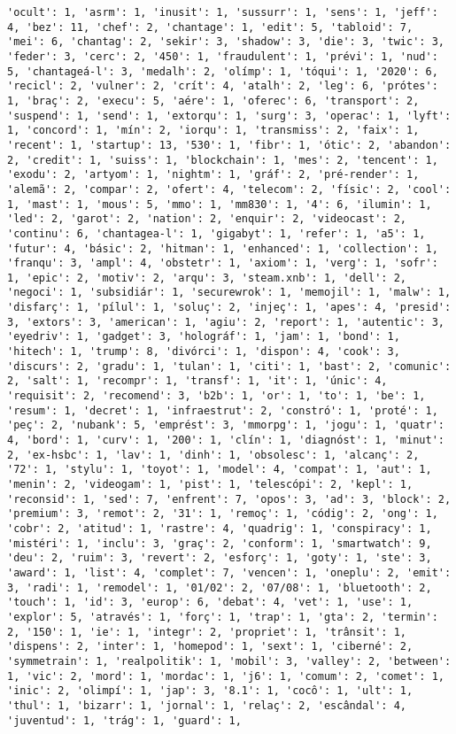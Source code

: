 \documentclass[11pt]{article}
\begin{document}
\begin{Verbatim}[commandchars=\\\{\}]
'ocult': 1, 'asrm': 1, 'inusit': 1, 'sussurr': 1, 'sens': 1, 'jeff': 4, 'bez': 11, 'chef': 2, 'chantage': 1, 'edit': 5, 'tabloid': 7, 'mei': 6, 'chantag': 2, 'sekir': 3, 'shadow': 3, 'die': 3, 'twic': 3, 'feder': 3, 'cerc': 2, '450': 1, 'fraudulent': 1, 'prévi': 1, 'nud': 5, 'chantageá-l': 3, 'medalh': 2, 'olímp': 1, 'tóqui': 1, '2020': 6, 'recicl': 2, 'vulner': 2, 'crít': 4, 'atalh': 2, 'leg': 6, 'prótes': 1, 'braç': 2, 'execu': 5, 'aére': 1, 'oferec': 6, 'transport': 2, 'suspend': 1, 'send': 1, 'extorqu': 1, 'surg': 3, 'operac': 1, 'lyft': 1, 'concord': 1, 'mín': 2, 'iorqu': 1, 'transmiss': 2, 'faix': 1, 'recent': 1, 'startup': 13, '530': 1, 'fibr': 1, 'ótic': 2, 'abandon': 2, 'credit': 1, 'suiss': 1, 'blockchain': 1, 'mes': 2, 'tencent': 1, 'exodu': 2, 'artyom': 1, 'nightm': 1, 'gráf': 2, 'pré-render': 1, 'alemã': 2, 'compar': 2, 'ofert': 4, 'telecom': 2, 'físic': 2, 'cool': 1, 'mast': 1, 'mous': 5, 'mmo': 1, 'mm830': 1, '4': 6, 'ilumin': 1, 'led': 2, 'garot': 2, 'nation': 2, 'enquir': 2, 'videocast': 2, 'continu': 6, 'chantagea-l': 1, 'gigabyt': 1, 'refer': 1, 'a5': 1, 'futur': 4, 'básic': 2, 'hitman': 1, 'enhanced': 1, 'collection': 1, 'franqu': 3, 'ampl': 4, 'obstetr': 1, 'axiom': 1, 'verg': 1, 'sofr': 1, 'epic': 2, 'motiv': 2, 'arqu': 3, 'steam.xnb': 1, 'dell': 2, 'negoci': 1, 'subsidiár': 1, 'securewrok': 1, 'memojil': 1, 'malw': 1, 'disfarç': 1, 'pílul': 1, 'soluç': 2, 'injeç': 1, 'apes': 4, 'presid': 3, 'extors': 3, 'american': 1, 'agiu': 2, 'report': 1, 'autentic': 3, 'eyedriv': 1, 'gadget': 3, 'holográf': 1, 'jam': 1, 'bond': 1, 'hitech': 1, 'trump': 8, 'divórci': 1, 'dispon': 4, 'cook': 3, 'discurs': 2, 'gradu': 1, 'tulan': 1, 'citi': 1, 'bast': 2, 'comunic': 2, 'salt': 1, 'recompr': 1, 'transf': 1, 'it': 1, 'únic': 4, 'requisit': 2, 'recomend': 3, 'b2b': 1, 'or': 1, 'to': 1, 'be': 1, 'resum': 1, 'decret': 1, 'infraestrut': 2, 'constró': 1, 'proté': 1, 'peç': 2, 'nubank': 5, 'emprést': 3, 'mmorpg': 1, 'jogu': 1, 'quatr': 4, 'bord': 1, 'curv': 1, '200': 1, 'clín': 1, 'diagnóst': 1, 'minut': 2, 'ex-hsbc': 1, 'lav': 1, 'dinh': 1, 'obsolesc': 1, 'alcanç': 2, '72': 1, 'stylu': 1, 'toyot': 1, 'model': 4, 'compat': 1, 'aut': 1, 'menin': 2, 'videogam': 1, 'pist': 1, 'telescópi': 2, 'kepl': 1, 'reconsid': 1, 'sed': 7, 'enfrent': 7, 'opos': 3, 'ad': 3, 'block': 2, 'premium': 3, 'remot': 2, '31': 1, 'remoç': 1, 'códig': 2, 'ong': 1, 'cobr': 2, 'atitud': 1, 'rastre': 4, 'quadrig': 1, 'conspiracy': 1, 'mistéri': 1, 'inclu': 3, 'graç': 2, 'conform': 1, 'smartwatch': 9, 'deu': 2, 'ruim': 3, 'revert': 2, 'esforç': 1, 'goty': 1, 'ste': 3, 'award': 1, 'list': 4, 'complet': 7, 'vencen': 1, 'oneplu': 2, 'emit': 3, 'radi': 1, 'remodel': 1, '01/02': 2, '07/08': 1, 'bluetooth': 2, 'touch': 1, 'id': 3, 'europ': 6, 'debat': 4, 'vet': 1, 'use': 1, 'explor': 5, 'através': 1, 'forç': 1, 'trap': 1, 'gta': 2, 'termin': 2, '150': 1, 'ie': 1, 'integr': 2, 'propriet': 1, 'trânsit': 1, 'dispens': 2, 'inter': 1, 'homepod': 1, 'sext': 1, 'ciberné': 2, 'symmetrain': 1, 'realpolitik': 1, 'mobil': 3, 'valley': 2, 'between': 1, 'vic': 2, 'mord': 1, 'mordac': 1, 'j6': 1, 'comum': 2, 'comet': 1, 'inic': 2, 'olimpí': 1, 'jap': 3, '8.1': 1, 'cocô': 1, 'ult': 1, 'thul': 1, 'bizarr': 1, 'jornal': 1, 'relaç': 2, 'escândal': 4, 'juventud': 1, 'trág': 1, 'guard': 1, 
\end{Verbatim}
\end{document}
